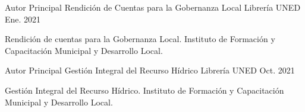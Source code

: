 

\begin{cventries}

  \cventry
    {Autor Principal} %
    {Rendición de Cuentas para la Gobernanza Local} %
    {Librería UNED} %
    {Ene. 2021} %
    {
      \begin{cvitems} %
        \item {Rendición de cuentas para la Gobernanza Local. Instituto de Formación y Capacitación Municipal y Desarrollo Local.}
      \end{cvitems}
    }

  \cventry
    {Autor Principal} %
    {Gestión Integral del Recurso Hídrico} %
    {Librería UNED} %
    {Oct. 2021} %
    {
      \begin{cvitems} %
        \item {Gestión Integral del Recurso Hídrico. Instituto de Formación y Capacitación Municipal y Desarrollo Local.}
      \end{cvitems}
    }

\end{cventries}
